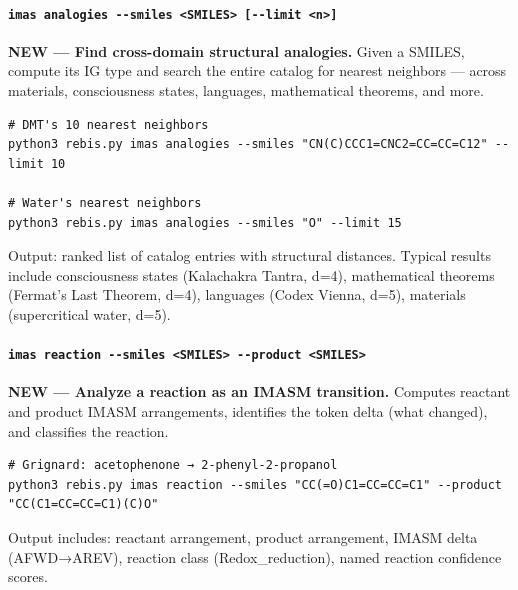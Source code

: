 \hypertarget{imas-analogies---smiles-smiles---limit-n}{%
\paragraph{\texorpdfstring{\texttt{imas\ analogies\ -\/-smiles\ \textless{}SMILES\textgreater{}\ {[}-\/-limit\ \textless{}n\textgreater{}{]}}}{imas analogies -\/-smiles \textless SMILES\textgreater{} {[}-\/-limit \textless n\textgreater{]}}}\label{imas-analogies---smiles-smiles---limit-n}}

\textbf{NEW --- Find cross-domain structural analogies.} Given a SMILES,
compute its IG type and search the entire catalog for nearest neighbors
--- across materials, consciousness states, languages, mathematical
theorems, and more.

\begin{verbatim}
# DMT's 10 nearest neighbors
python3 rebis.py imas analogies --smiles "CN(C)CCC1=CNC2=CC=CC=C12" --limit 10

# Water's nearest neighbors
python3 rebis.py imas analogies --smiles "O" --limit 15
\end{verbatim}

Output: ranked list of catalog entries with structural distances.
Typical results include consciousness states (Kalachakra Tantra, d=4),
mathematical theorems (Fermat's Last Theorem, d=4), languages (Codex
Vienna, d=5), materials (supercritical water, d=5).

\hypertarget{imas-reaction---smiles-smiles---product-smiles}{%
\paragraph{\texorpdfstring{\texttt{imas\ reaction\ -\/-smiles\ \textless{}SMILES\textgreater{}\ -\/-product\ \textless{}SMILES\textgreater{}}}{imas reaction -\/-smiles \textless SMILES\textgreater{} -\/-product \textless SMILES\textgreater{}}}\label{imas-reaction---smiles-smiles---product-smiles}}

\textbf{NEW --- Analyze a reaction as an IMASM transition.} Computes
reactant and product IMASM arrangements, identifies the token delta
(what changed), and classifies the reaction.

\begin{verbatim}
# Grignard: acetophenone → 2-phenyl-2-propanol
python3 rebis.py imas reaction --smiles "CC(=O)C1=CC=CC=C1" --product "CC(C1=CC=CC=C1)(C)O"
\end{verbatim}

Output includes: reactant arrangement, product arrangement, IMASM delta
(AFWD→AREV), reaction class (Redox\_reduction), named reaction
confidence scores.

